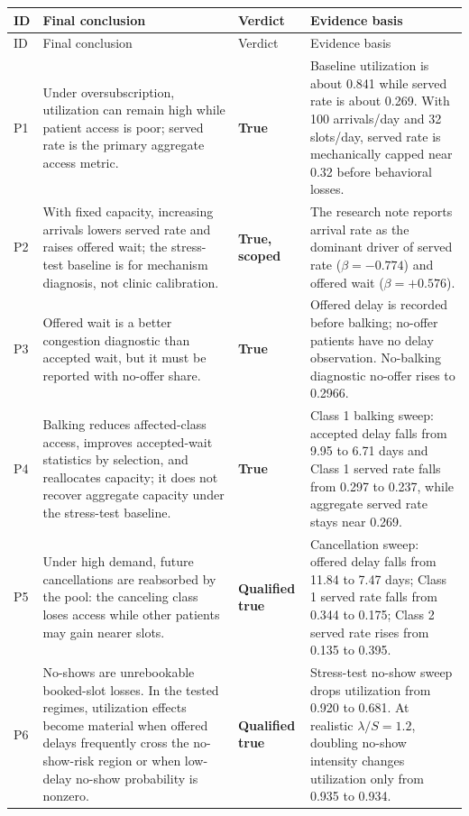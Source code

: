 \documentclass[11pt]{article}
\newcommand{\status}[1]{\textbf{#1}}
\begin{document}
\begin{longtable}{P{0.07\textwidth} P{0.44\textwidth} P{0.13\textwidth} P{0.28\textwidth}}
\toprule
ID & Final conclusion & Verdict & Evidence basis \\
\midrule
\endfirsthead
\toprule
ID & Final conclusion & Verdict & Evidence basis \\
\midrule
\endhead
P1 &
Under oversubscription, utilization can remain high while patient access is
poor; served rate is the primary aggregate access metric. &
\status{True} &
Baseline utilization is about 0.841 while served rate is about 0.269. With
100 arrivals/day and 32 slots/day, served rate is mechanically capped near
0.32 before behavioral losses. \\

P2 &
With fixed capacity, increasing arrivals lowers served rate and raises offered
wait; the stress-test baseline is for mechanism diagnosis, not clinic
calibration. &
\status{True, scoped} &
The research note reports arrival rate as the dominant driver of served rate
($\beta=-0.774$) and offered wait ($\beta=+0.576$). \\

P3 &
Offered wait is a better congestion diagnostic than accepted wait, but it must
be reported with no-offer share. &
\status{True} &
Offered delay is recorded before balking; no-offer patients have no delay
observation. No-balking diagnostic no-offer rises to 0.2966. \\

P4 &
Balking reduces affected-class access, improves accepted-wait statistics by
selection, and reallocates capacity; it does not recover aggregate capacity
under the stress-test baseline. &
\status{True} &
Class 1 balking sweep: accepted delay falls from 9.95 to 6.71 days and Class 1
served rate falls from 0.297 to 0.237, while aggregate served rate stays near
0.269. \\

P5 &
Under high demand, future cancellations are reabsorbed by the pool: the
canceling class loses access while other patients may gain nearer slots. &
\status{Qualified true} &
Cancellation sweep: offered delay falls from 11.84 to 7.47 days; Class 1 served
rate falls from 0.344 to 0.175; Class 2 served rate rises from 0.135 to 0.395. \\

P6 &
No-shows are unrebookable booked-slot losses. In the tested regimes, utilization
effects become material when offered delays frequently cross the no-show-risk
region or when low-delay no-show probability is nonzero. &
\status{Qualified true} &
Stress-test no-show sweep drops utilization from 0.920 to 0.681. At realistic
$\lambda/S=1.2$, doubling no-show intensity changes utilization only from
0.935 to 0.934. \\


\end{longtable}
\end{document}
